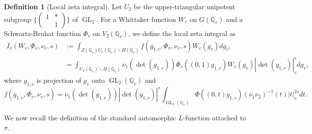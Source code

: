 \documentclass[11pt, a4paper]{amsart}
\theoremstyle{plain}
\theoremstyle{definition}
\newtheorem{definition}[theorem]{Definition}
\numberwithin{equation}{section}
\def\QQ{\mathbb{Q}}
\DeclareMathOperator{\GL}{\mathrm{GL}}
\begin{document}
\begin{definition}[Local zeta integral]
\label{def: local zeta integral}
    Let $U_2$ be the upper-triangular unipotent subgroup $\{\begin{pmatrix}
                                                               1 & * \\
                                                                 & 1
                                                            \end{pmatrix}\}$ of $\GL_2$. For a Whittaker function $W_{v}$ on $G(\QQ_{v})$ and a Schwartz-Bruhat function $\Phi_{v}$ on $V_{2}(\QQ_v)$, 
    we define the local zeta integral as
    \begin{align}
    \label{eqn: def of local I}
        I_{v}(W_{v}, \Phi_{v}, \nu_v, s) &:= \int_{Z(\QQ_{v})U_{2}(\QQ_v) \backslash H(\QQ_v)} f(g_{1, v}, \Phi_{v}, \nu_{v}, s) W_{v}(g_v) dg_{v}, \\
                                         &= \int_{U_{2}(\QQ_v) \backslash H(\QQ_v)} \nu_1(\det(g_{1, v})) \Phi_{v}((0,1)g_{1,v}) W_{v}(g_v) |\det(g_{1,v})|_{v}^{s}dg_{v}, 
    \end{align}
    where $g_{1,v}$ is projection of $g_v$ onto $\GL_2(\QQ_v)$ and 
    \begin{equation*}
        f(g_{1,v}, \Phi_{v}, \nu_{v}, s) = \nu_{1}(\det(g_{1,v}))|\det(g_{1,v})|^{s} \int_{\GL_1(\QQ_{v})} \Phi((0, t)g_{1,v}) (\nu_1\nu_2)^{-1}(t) |t|_{v}^{2s} dt. 
    \end{equation*}
\end{definition}

We now recall the definition of the standard automorphic $L$-function attached to $\pi$. 
\end{document}
